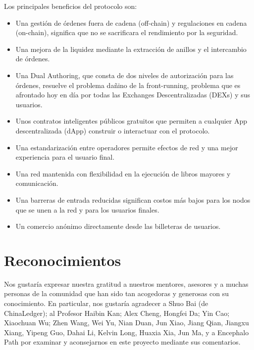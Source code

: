 \documentclass[UTF8,nofonts]{article}
\begin{document}
\begin{multicols}{2}
Los principales beneficios del protocolo son:
\begin{itemize}
	\item Una gesti\'on de \'ordenes fuera de cadena (off-chain) y regulaciones en cadena (on-chain), significa que no se sacrificara el rendimiento por la seguridad.
	\item Una mejora de la liquidez mediante la extracci\'on de anillos y el intercambio de \'ordenes.
	\item Una Dual Authoring, que consta de dos niveles de autorizaci\'on para las \'ordenes, resuelve el problema da\~nino de la front-running, problema que es afrontado hoy en d\'ia por todas las Exchanges Descentralizadas (DEXs) y sus usuarios.
	\item Unos contratos inteligentes p\'ublicos gratuitos que permiten a cualquier App descentralizada (dApp) construir o interactuar con el protocolo.
	\item Una estandarizaci\'on entre operadores permite efectos de red y una mejor experiencia para el usuario final.
	\item Una red mantenida con flexibilidad en la ejecuci\'on de libros mayores y comunicaci\'on.
	\item Una barreras de entrada reducidas significan costos m\'as bajos para los nodos que se unen a la red y para los usuarios finales.
	\item Un comercio an\'onimo directamente desde las billeteras de usuarios.
\end{itemize}


\section{Reconocimientos}
Nos gustar\'ia expresar nuestra gratitud a nuestros mentores, asesores y a muchas personas de la comunidad que han sido tan acogedoras y generosas con su conocimiento. En particular, nos gustar\'ia agradecer a Shuo Bai (de ChinaLedger); al Profesor Haibin Kan; Alex Cheng, Hongfei Da; Yin Cao; Xiaochuan Wu; Zhen Wang, Wei Yu, Nian Duan, Jun Xiao, Jiang Qian, Jiangxu Xiang, Yipeng Guo, Dahai Li, Kelvin Long, Huaxia Xia, Jun Ma, y a Encephalo Path por examinar y aconsejarnos en este proyecto mediante sus comentarios.





\end{multicols}
\end{document}
